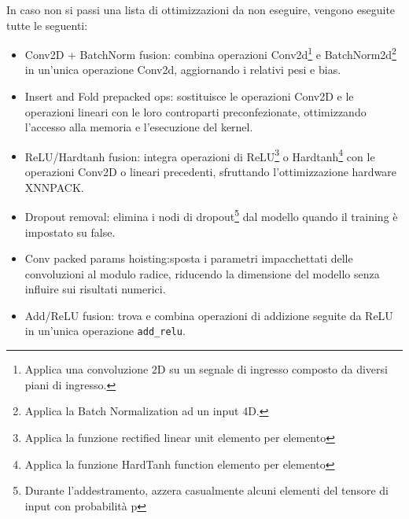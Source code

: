 In caso non si passi una lista di ottimizzazioni da non eseguire, vengono eseguite tutte le seguenti:
\begin{itemize}
    \item Conv2D + BatchNorm fusion: combina operazioni Conv2d\footnote{Applica una convoluzione 2D su un segnale di ingresso composto da diversi piani di ingresso.}
    e BatchNorm2d\footnote{Applica la Batch Normalization ad un input 4D.} in un'unica operazione Conv2d, aggiornando i relativi pesi e bias.
    \item Insert and Fold prepacked ops: sostituisce le operazioni Conv2D e le operazioni lineari con le loro controparti preconfezionate, ottimizzando l'accesso alla memoria e l'esecuzione del kernel.
    \item ReLU/Hardtanh fusion: integra operazioni di ReLU\footnote{Applica la funzione rectified linear unit elemento per elemento} o
    Hardtanh\footnote{Applica la funzione HardTanh function elemento per elemento} con le operazioni Conv2D o lineari precedenti, sfruttando l'ottimizzazione hardware XNNPACK.
    \item Dropout removal: elimina i nodi di dropout\footnote{Durante l'addestramento, azzera casualmente alcuni elementi del tensore di input
    con probabilità p} dal modello quando il training è impostato su false.
    \item Conv packed params hoisting:sposta i parametri impacchettati delle convoluzioni al modulo radice, riducendo la dimensione del modello senza
    influire sui risultati numerici.
    \item Add/ReLU fusion: trova e combina operazioni di addizione seguite da ReLU in un'unica operazione \texttt{add\_relu}.
\end{itemize}

